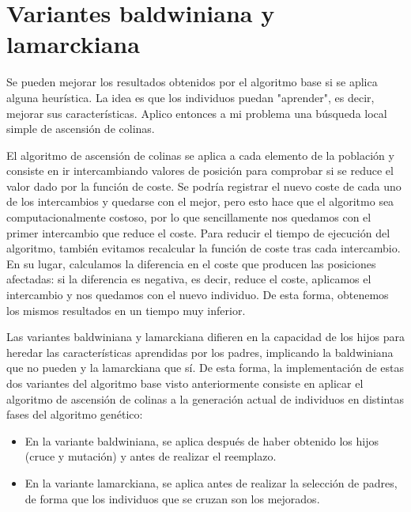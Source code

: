 \section{Variantes baldwiniana y lamarckiana}
Se pueden mejorar los resultados obtenidos por el algoritmo base si se aplica alguna heurística. La idea es que los individuos puedan "aprender", es decir, mejorar sus características. Aplico entonces a mi problema una búsqueda local simple de ascensión de colinas.

El algoritmo de ascensión de colinas se aplica a cada elemento de la población y consiste en ir intercambiando valores de posición para comprobar si se reduce el valor dado por la función de coste. Se podría registrar el nuevo coste de cada uno de los intercambios y quedarse con el mejor, pero esto hace que el algoritmo sea computacionalmente costoso, por lo que sencillamente nos quedamos con el primer intercambio que reduce el coste. Para reducir el tiempo de ejecución del algoritmo, también evitamos recalcular la función de coste tras cada intercambio. En su lugar, calculamos la diferencia en el coste que producen las posiciones afectadas: si la diferencia es negativa, es decir, reduce el coste, aplicamos el intercambio y nos quedamos con el nuevo individuo. De esta forma, obtenemos los mismos resultados en un tiempo muy inferior.

Las variantes baldwiniana y lamarckiana difieren en la capacidad de los hijos para heredar las características aprendidas por los padres, implicando la baldwiniana que no pueden y la lamarckiana que sí. De esta forma, la implementación de estas dos variantes del algoritmo base visto anteriormente consiste en aplicar el algoritmo de ascensión de colinas a la generación actual de individuos en distintas fases del algoritmo genético:

\begin{itemize}
    \item En la variante baldwiniana, se aplica después de haber obtenido los hijos (cruce y mutación) y antes de realizar el reemplazo.
    \item En la variante lamarckiana, se aplica antes de realizar la selección de padres, de forma que los individuos que se cruzan son los mejorados.
\end{itemize}